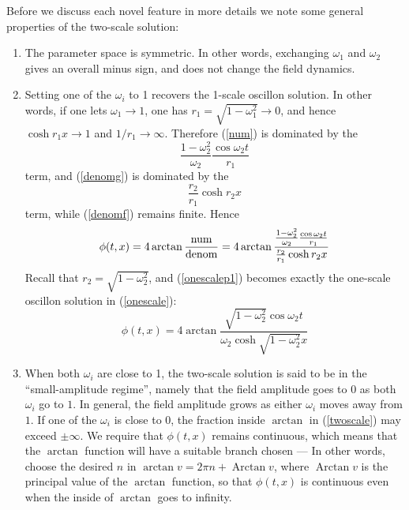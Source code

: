 \documentclass{report}
\DeclareMathOperator{\Arctan}{Arctan}
\begin{document}
Before we discuss each novel feature in more details we note some general properties of the two-scale solution:
\begin{enumerate}
\item The parameter space is symmetric. In other words, exchanging $\omega_1$ and $\omega_2$ gives an overall minus sign, and does not change the field dynamics.
\item Setting one of the $\omega_i$ to 1 recovers the 1-scale oscillon solution. In other words, if one lets $\omega_1\to1$, one has $r_1=\sqrt{1-\omega_1^2}\to0$, and hence $\cosh r_1 x\to1$ and $1/r_1 \to \infty$. Therefore (\ref{num}) is dominated by the
  \begin{equation}
    \frac{1-\omega^2_2}{\omega_2}\frac{\cos\omega_2 t}{r_1}
  \end{equation}
  term, and (\ref{denomg}) is dominated by the
  \begin{equation}
    \frac{r_2}{r_1}\cosh r_2 x
  \end{equation}
  term, while (\ref{denomf}) remains finite. Hence
  \begin{equation}\label{onescalep1}
    \phi(t,x) = 4\arctan \frac{\rm num}{\rm denom} = 4\arctan \frac{\frac{1-\omega^2_2}{\omega_2}\frac{\cos\omega_2 t}{r_1}}{\frac{r_2}{r_1}\cosh r_2 x}
  \end{equation}
  Recall that $r_2=\sqrt{1-\omega_2^2}$, and (\ref{onescalep1}) becomes exactly the one-scale oscillon solution in (\ref{onescale}):
  \begin{equation}
    \phi(t,x) = 4\arctan \frac{\sqrt{1-\omega_2^2}\cos\omega_2 t}{\omega_2 \cosh \sqrt{1-\omega_2^2} x}
  \end{equation}

\item When both $\omega_i$ are close to 1, the two-scale solution is said to be in the ``small-amplitude regime'', namely that the field amplitude goes to $0$ as both $\omega_i$ go to $1$. In general, the field amplitude grows as either $\omega_i$ moves away from $1$. If one of the $\omega_i$ is close to 0, the fraction inside $\arctan$ in (\ref{twoscale}) may exceed $\pm\infty$. We require that $\phi(t,x)$ remains continuous, which means that the $\arctan$ function will have a suitable branch chosen --- In other words, choose the desired $n$ in $\arctan v = 2\pi n+ \Arctan v$, where $\Arctan v$ is the principal value of the $\arctan$ function, so that $\phi(t,x)$ is continuous even when the inside of $\arctan$ goes to infinity.
\end{enumerate}
\end{document}
